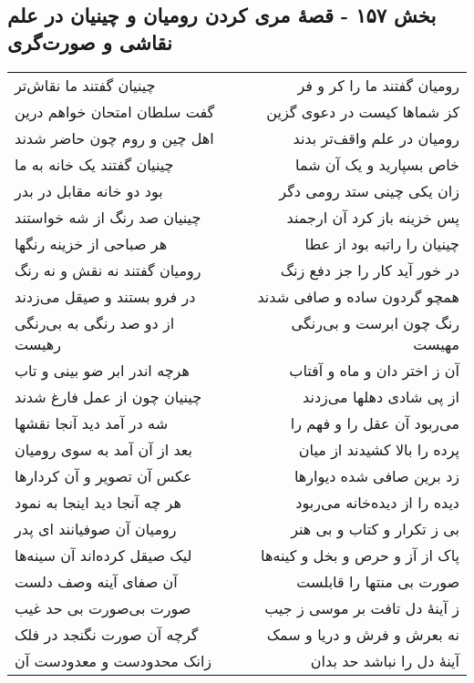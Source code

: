 \begin{center}
\section*{بخش ۱۵۷ - قصهٔ مری کردن رومیان و چینیان در علم نقاشی و صورت‌گری}
\label{sec:sh157}
\begin{longtable}{l p{0.5cm} r}
چینیان گفتند ما نقاش‌تر
&&
رومیان گفتند ما را کر و فر
\\
گفت سلطان امتحان خواهم درین
&&
کز شماها کیست در دعوی گزین
\\
اهل چین و روم چون حاضر شدند
&&
رومیان در علم واقف‌تر بدند
\\
چینیان گفتند یک خانه به ما
&&
خاص بسپارید و یک آن شما
\\
بود دو خانه مقابل در بدر
&&
زان یکی چینی ستد رومی دگر
\\
چینیان صد رنگ از شه خواستند
&&
پس خزینه باز کرد آن ارجمند
\\
هر صباحی از خزینه رنگها
&&
چینیان را راتبه بود از عطا
\\
رومیان گفتند نه نقش و نه رنگ
&&
در خور آید کار را جز دفع زنگ
\\
در فرو بستند و صیقل می‌زدند
&&
همچو گردون ساده و صافی شدند
\\
از دو صد رنگی به بی‌رنگی رهیست
&&
رنگ چون ابرست و بی‌رنگی مهیست
\\
هرچه اندر ابر ضو بینی و تاب
&&
آن ز اختر دان و ماه و آفتاب
\\
چینیان چون از عمل فارغ شدند
&&
از پی شادی دهلها می‌زدند
\\
شه در آمد دید آنجا نقشها
&&
می‌ربود آن عقل را و فهم را
\\
بعد از آن آمد به سوی رومیان
&&
پرده را بالا کشیدند از میان
\\
عکس آن تصویر و آن کردارها
&&
زد برین صافی شده دیوارها
\\
هر چه آنجا دید اینجا به نمود
&&
دیده را از دیده‌خانه می‌ربود
\\
رومیان آن صوفیانند ای پدر
&&
بی ز تکرار و کتاب و بی هنر
\\
لیک صیقل کرده‌اند آن سینه‌ها
&&
پاک از آز و حرص و بخل و کینه‌ها
\\
آن صفای آینه وصف دلست
&&
صورت بی منتها را قابلست
\\
صورت بی‌صورت بی حد غیب
&&
ز آینهٔ دل تافت بر موسی ز جیب
\\
گرچه آن صورت نگنجد در فلک
&&
نه بعرش و فرش و دریا و سمک
\\
زانک محدودست و معدودست آن
&&
آینهٔ دل را نباشد حد بدان
\\

\end{longtable}
\end{center}

